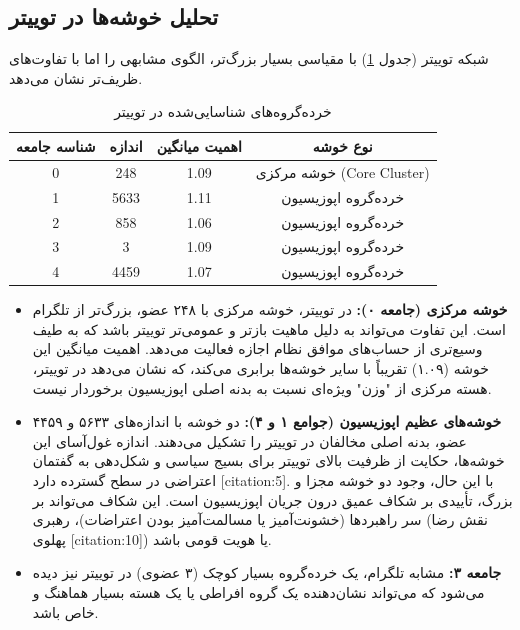 \documentclass{article}
\begin{document}
	\subsection{تحلیل خوشه‌ها در توییتر}
	شبکه توییتر (جدول \ref{tab:communities_twitter}) با مقیاسی بسیار بزرگ‌تر، الگوی مشابهی را اما با تفاوت‌های ظریف‌تر نشان می‌دهد.
	
	\begin{table}[h!]
		\centering
		\caption{خرده‌گروه‌های شناسایی‌شده در توییتر}
		\label{tab:communities_twitter}
		\begin{tabular}{@{}cccc@{}}
			\toprule
			\textbf{شناسه جامعه} & \textbf{اندازه} & \textbf{اهمیت میانگین} & \textbf{نوع خوشه} \\ \midrule
			0                    & 248              & 1.09                   & خوشه مرکزی (Core Cluster) \\
			1                    & 5633             & 1.11                   & خرده‌گروه اپوزیسیون \\
			2                    & 858              & 1.06                   & خرده‌گروه اپوزیسیون \\
			3                    & 3                & 1.09                   & خرده‌گروه اپوزیسیون \\
			4                    & 4459             & 1.07                   & خرده‌گروه اپوزیسیون \\ \bottomrule
		\end{tabular}
	\end{table}
	
	\begin{itemize}
		\item \textbf{خوشه مرکزی (جامعه ۰):} در توییتر، خوشه مرکزی با ۲۴۸ عضو، بزرگ‌تر از تلگرام است. این تفاوت می‌تواند به دلیل ماهیت بازتر و عمومی‌تر توییتر باشد که به طیف وسیع‌تری از حساب‌های موافق نظام اجازه فعالیت می‌دهد. اهمیت میانگین این خوشه (۱.۰۹) تقریباً با سایر خوشه‌ها برابری می‌کند، که نشان می‌دهد در توییتر، هسته مرکزی از "وزن" ویژه‌ای نسبت به بدنه اصلی اپوزیسیون برخوردار نیست.
		\item \textbf{خوشه‌های عظیم اپوزیسیون (جوامع ۱ و ۴):} دو خوشه با اندازه‌های ۵۶۳۳ و ۴۴۵۹ عضو، بدنه اصلی مخالفان در توییتر را تشکیل می‌دهند. اندازه غول‌آسای این خوشه‌ها، حکایت از ظرفیت بالای توییتر برای بسیج سیاسی و شکل‌دهی به گفتمان اعتراضی در سطح گسترده دارد [citation:5]. با این حال، وجود دو خوشه مجزا و بزرگ، تأییدی بر شکاف عمیق درون جریان اپوزیسیون است. این شکاف می‌تواند بر سر راهبردها (خشونت‌آمیز یا مسالمت‌آمیز بودن اعتراضات)، رهبری (نقش رضا پهلوی [citation:10]) یا هویت قومی باشد.
		\item \textbf{جامعه ۳:} مشابه تلگرام، یک خرده‌گروه بسیار کوچک (۳ عضوی) در توییتر نیز دیده می‌شود که می‌تواند نشان‌دهنده یک گروه افراطی یا یک هسته بسیار هماهنگ و خاص باشد.
	\end{itemize}
	
\end{document}
